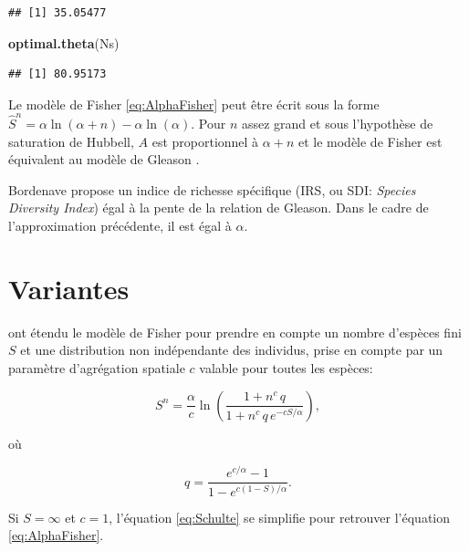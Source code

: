 \documentclass[
  11pt,
  french,
  a4paper,
  extrafontsizes,onecolumn,openright
  ]{memoir}
\newenvironment{Shaded}{\begin{snugshade}}{\end{snugshade}}
\newcommand{\KeywordTok}[1]{\textcolor[rgb]{0.13,0.29,0.53}{\textbf{#1}}}
\newcommand{\NormalTok}[1]{#1}
\begin{document}
\begin{verbatim}
## [1] 35.05477
\end{verbatim}

\begin{Shaded}
\begin{Highlighting}[]
\KeywordTok{optimal.theta}\NormalTok{(Ns)}
\end{Highlighting}
\end{Shaded}

\begin{verbatim}
## [1] 80.95173
\end{verbatim}

\normalsize

Le modèle de Fisher \eqref{eq:AlphaFisher} peut être écrit sous la forme \(\hat{S}^{n} = \alpha{\ln\left(\alpha+n\right)}-\alpha\ln\left(\alpha\right)\).
Pour \(n\) assez grand et sous l'hypothèse de saturation de Hubbell\autocite{Hubbell2001}, \(A\) est proportionnel à \(\alpha+n\) et le modèle de Fisher est équivalent au modèle de Gleason \autocite{Engen1977}.

Bordenave \autocite{Bordenave1998,Bordenave2011} propose un indice de richesse spécifique (IRS, ou SDI: \emph{Species Diversity Index}) égal à la pente de la relation de Gleason.
Dans le cadre de l'approximation précédente, il est égal à \(\alpha\).

\hypertarget{variantes}{%
\section{Variantes}\label{variantes}}

\textcite{Schulte2005} ont étendu le modèle de Fisher pour prendre en compte un nombre d'espèces fini \(S\) et une distribution non indépendante des individus, prise en compte par un paramètre d'agrégation spatiale \(c\) valable pour toutes les espèces:

\begin{equation} 
  \label{eq:Schulte}
  S^{n} = \frac{\alpha}{c} \ln\left(\frac{1+ n^c\,q}{1+ n^c\,q\,e^{-cS/\alpha}}\right),
\end{equation}

où

\begin{equation}
  \label{eq:Schulteq}
  q =\frac{e^{c/\alpha}-1}{1-e^{c\left(1-S\right)/\alpha}}.
\end{equation}

Si \(S = \infty\) et \(c = 1\), l'équation \eqref{eq:Schulte} se simplifie pour retrouver l'équation \eqref{eq:AlphaFisher}.
\end{document}
